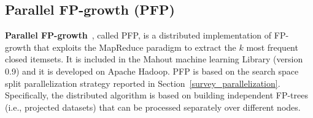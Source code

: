 \subsection{Parallel FP-growth (PFP)}
\label{FP-Growth}
{\bf Parallel FP-growth}~\cite{pfpgrowth}, called PFP, is a distributed implementation of FP-growth
that exploits the MapReduce paradigm to extract the $k$ most frequent closed
itemsets. It is included in the Mahout machine learning Library (version 0.9)
and it is developed on Apache Hadoop. 
PFP is based on the search space split parallelization strategy reported in Section~\ref{survey_parallelization}. 
Specifically, the distributed algorithm is based on building independent FP-trees (i.e., projected datasets) that can be processed separately
over different nodes.

